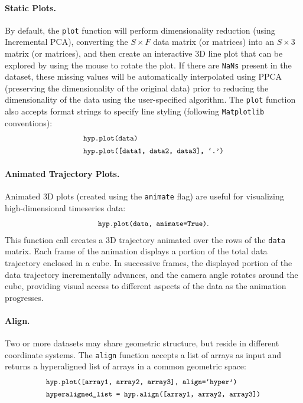 \documentclass[twoside,11pt]{article}
\begin{document}
\paragraph{Static Plots.} By default, the \texttt{plot} function will perform dimensionality reduction (using Incremental PCA), converting the $S \times F$ data matrix (or matrices) into an $S \times 3$ matrix (or matrices), and then create an interactive 3D line plot that can be explored by using the mouse to rotate the plot. If there are \texttt{NaNs} present in the dataset, these missing values will be automatically interpolated using PPCA~\citep{TippBish99} (preserving the dimensionality of the original data) prior to reducing the dimensionality of the data using the user-specified algorithm.  The \texttt{plot} function also accepts format strings to specify line styling (following \texttt{Matplotlib} conventions):
\begin{align}
\small
& \texttt{\small hyp.plot(data)} \\
& \texttt{\small hyp.plot([data1, data2, data3], `.')}
\end{align}


\paragraph{Animated Trajectory Plots.} Animated 3D plots (created using the \texttt{animate} flag) are useful for visualizing high-dimensional timeseries data:
\begin{align}
\texttt{\small hyp.plot(data, animate=True)}.
\end{align}
This function call creates a 3D trajectory animated over the rows of the \texttt{data} matrix. Each frame of the animation displays a portion of the total data trajectory enclosed in a cube.  In successive frames, the displayed portion of the data trajectory incrementally advances, and the camera angle rotates around the cube, providing visual access to different aspects of the data as the animation progresses.

\paragraph{Align.} Two or more datasets may share geometric structure, but reside in different coordinate systems. The \texttt{align} function accepts a list of arrays as input and returns a hyperaligned list of arrays in a common geometric space:
\begin{align}
& \texttt{\small hyp.plot([array1, array2, array3], align=`hyper')} \\
& \texttt{\small hyperaligned\_list = hyp.align([array1, array2, array3])}
\end{align}
\end{document}
